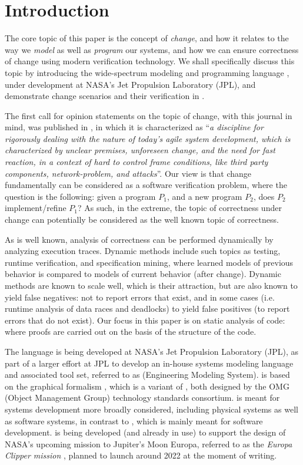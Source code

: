 
\section{Introduction}

The core topic of this paper is the concept of {\em change}, and how
it relates to the way we {\em model} as well as {\em program} our
systems, and how we can ensure correctness of change using modern
verification technology.  We shall specifically discuss this topic by
introducing the wide-spectrum modeling and programming language
\Klang, under development at NASA's Jet Propulsion Laboratory (JPL),
and demonstrate change scenarios and their verification in \Klang.

The first call for opinion statements on the topic of change, with
this journal in mind, was published in \cite{steffen-isola-2014}, in
which it is characterized as ``{\em a discipline for rigorously
  dealing with the nature of today's agile system development, which
  is characterized by unclear premises, unforeseen change, and the
  need for fast reaction, in a context of hard to control frame
  conditions, like third party components, network-problem, and
  attacks}''.
%
Our view is that change fundamentally can be considered as a software
verification problem, where the question is the following: given a
program $P_1$, and a new program $P_2$, does $P_2$ implement/refine
$P_1$?  As such, in the extreme, the topic of correctness under change
can potentially be considered as the well known topic of correctness.

As is well known, analysis of correctness can be performed dynamically
by analyzing execution traces. Dynamic methods include such topics as
testing, runtime verification, and specification mining, where learned
models of previous behavior is compared to models of current behavior
(after change). Dynamic methods are known to scale well, which is
their attraction, but are also known to yield false negatives: not to
report errors that exist, and in some cases (i.e. runtime analysis of
data races and deadlocks) to yield false positives (to report errors
that do not exist). Our focus in this paper is on static analysis of
code: where proofs are carried out on the basis of the structure of
the code.

The \Klang{} language is being developed at NASA's Jet Propulsion
Laboratory (JPL), as part of a larger effort at JPL to develop an
in-house systems modeling language and associated tool set, referred
to as \ems{} (Engineering Modeling System). \ems{} is based on the
graphical \sysml{} formalism \cite{sysml}, which is a variant of
\uml{} \cite{uml}, both designed by the OMG (Object Management Group)
technology standards consortium. \sysml{} is meant for systems
development more broadly considered, including physical systems as
well as software systems, in contrast to \uml{}, which is mainly meant
for software development.  \ems{} is being developed (and already in
use) to support the design of NASA's upcoming mission to Jupiter's
Moon Europa, referred to as the {\em Europa Clipper mission}
\cite{europa-clipper}, planned to launch around 2022 at the moment of
writing.

